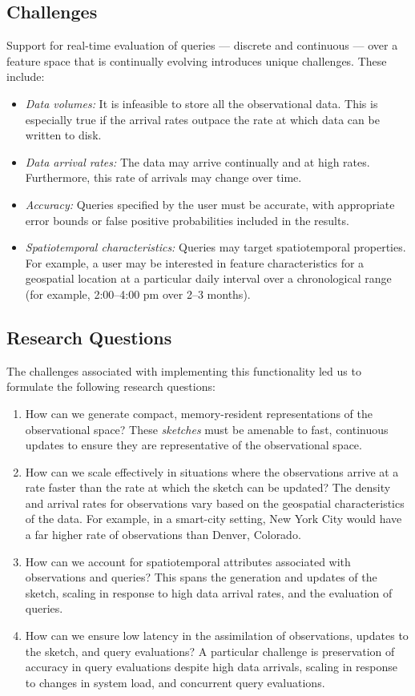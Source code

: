 \subsection{Challenges}
Support for real-time evaluation of queries --- discrete and continuous --- over a feature space that is continually evolving introduces unique challenges. These include:
\begin{itemize}
    \item   \emph{Data volumes:} It is infeasible to store all the observational data. This is especially true if the arrival rates outpace the rate at which data can be written to disk.
    \item   \emph{Data arrival rates:} The data may arrive continually and at high rates. Furthermore, this rate of arrivals may change over time.
    \item   \emph{Accuracy:} Queries specified by the user must be accurate, with appropriate error bounds or false positive probabilities included in the results.
    \item   \emph{Spatiotemporal characteristics:} Queries may target spatiotemporal properties. For example, a user may be interested in feature characteristics for a geospatial location at a particular daily interval over a chronological range (for example, 2:00--4:00 pm over 2--3 months).
\end{itemize}

\subsection{Research Questions}
The challenges associated with implementing this functionality led us to formulate the following research questions:
\begin{enumerate}
    \item   How can we generate compact, memory-resident representations of the observational space? These \emph{sketches} must be amenable to fast, continuous updates to ensure they are representative of the observational space.
    \item   How can we scale effectively in situations where the observations arrive at a rate faster than the rate at which the sketch can be updated? The density and arrival rates for observations vary based on the geospatial characteristics of the data. For example, in a smart-city setting, New York City would have a far higher rate of observations than Denver, Colorado.
    \item   How can we account for spatiotemporal attributes associated with observations and queries? This spans the generation and updates of the sketch, scaling in response to high data arrival rates, and the evaluation of queries.
    \item   How can we ensure low latency in the assimilation of observations, updates to the sketch, and query evaluations? A particular challenge is preservation of accuracy in query evaluations despite high data arrivals, scaling in response to changes in system load, and concurrent query evaluations.
\end{enumerate}

